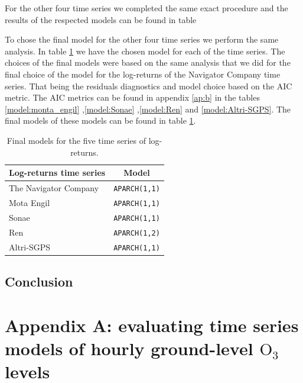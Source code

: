 \documentclass{article}
\begin{document}
For the other four time series we completed the same exact procedure and the results of the respected models can be found in table 

To chose the final model for the other four time series we 
perform the same analysis. In table \ref{tab:final_ts} we have the  
chosen model for each of the time series. 
The choices of the final models were 
based on the same analysis that we did for the final choice 
of the model for the log-returns of the Navigator Company time series. 
That being the residuals diagnostics and 
model choice based on the AIC metric. The AIC metrics can 
be found in appendix \ref{ap:b} in the tables \ref{model:monta_engil} ,\ref{model:Sonae} ,\ref{model:Ren} and \ref{model:Altri-SGPS}.
The final models of these models can be found in table \ref{tab:final_ts}.

\newpage

\begin{table}[ht!]
    \centering
    \begin{tabular}{|l|c|}
        \hline
        Log-returns time series & Model \\
        \hline
        The Navigator Company & \verb|APARCH(1,1)| \\
        \hline
        Mota Engil & \verb|APARCH(1,1)|  \\
        \hline
        Sonae  &  \verb|APARCH(1,1)| \\
        \hline
        Ren &  \verb|APARCH(1,2)| \\
        \hline
        Altri-SGPS & \verb|APARCH(1,1)| \\
        \hline
    \end{tabular}
    \caption{Final models for the five time series of log-returns.}
    \label{tab:final_ts}
\end{table}

\subsection{Conclusion}

\newpage

\appendix

\section{Appendix A: evaluating time series models of hourly ground-level $\text{O}_3$ levels}
\label{ap:a}
\end{document}
